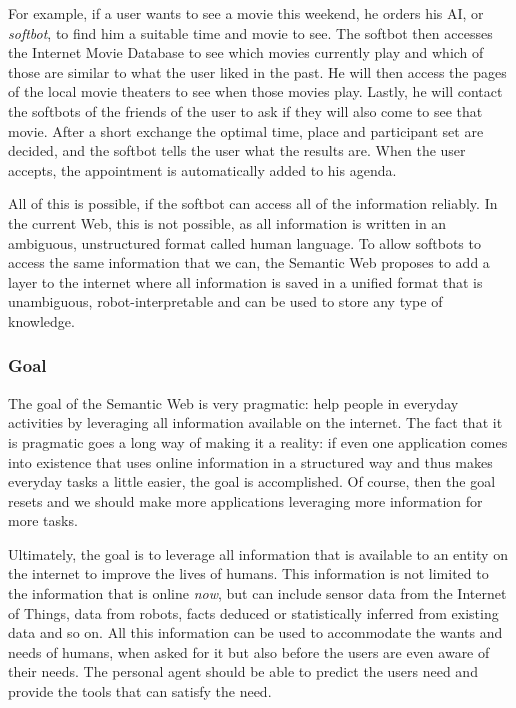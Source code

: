 \documentclass{article}
\begin{document}
For example, if a user wants to see a movie this weekend, he orders his AI, or \textit{softbot}, to find him a suitable time and movie to see. The softbot then accesses the Internet Movie Database to see which movies currently play and which of those are similar to what the user liked in the past. He will then access the pages of the local movie theaters to see when those movies play. Lastly, he will contact the softbots of the friends of the user to ask if they will also come to see that movie. After a short exchange the optimal time, place and participant set are decided, and the softbot tells the user what the results are. When the user accepts, the appointment is automatically added to his agenda. %

All of this is possible, if the softbot can access all of the information reliably. In the current Web, this is not possible, as all information is written in an ambiguous, unstructured format called human language. To allow softbots to access the same information that we can, the Semantic Web proposes to add a layer to the internet where all information is saved in a unified format that is unambiguous, robot-interpretable and can be used to store any type of knowledge.
 
 \subsubsection{Goal}
 The goal of the Semantic Web is very pragmatic: help people in everyday activities by leveraging all information available on the internet. The fact that it is pragmatic goes a long way of making it a reality: if even one application comes into existence that uses online information in a structured way and thus makes everyday tasks a little easier, the goal is accomplished. Of course, then the goal resets and we should make more applications leveraging more information for more tasks.
 
 Ultimately, the goal is to leverage all information that is available to an entity on the internet to improve the lives of humans. This information is not limited to the information that is online \emph{now}, but can include sensor data from the Internet of Things, data from robots, facts deduced or statistically inferred from existing data and so on. All this information can be used to accommodate the wants and needs of humans, when asked for it but also before the users are even aware of their needs. The personal agent should be able to predict the users need and provide the tools that can satisfy the need.
 
\end{document}
